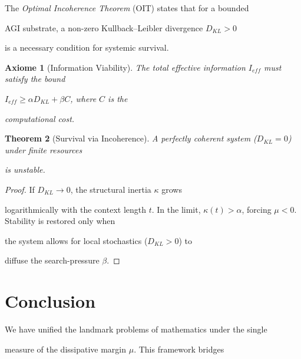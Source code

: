 ﻿\documentclass[11pt,a4paper]{amsart}
\newtheorem{theorem}{Theorem}[section]
\newtheorem{axiom}[theorem]{Axiome}
\newcommand{\alphacoeff}{\ensuremath{\alpha}}
\newcommand{\betacoeff}{\ensuremath{\beta}}
\newcommand{\kappacoeff}{\ensuremath{\kappa}}
\newcommand{\mumargin}{\ensuremath{\mu}}
\begin{document}
The \emph{Optimal Incoherence Theorem} (OIT) states that for a bounded

AGI substrate, a non-zero Kullback--Leibler divergence $D_{KL} > 0$

is a necessary condition for systemic survival.



\begin{axiom}[Information Viability]

The total effective information $I_{eff}$ must satisfy the bound

$I_{eff} \ge \alphacoeff D_{KL} + \betacoeff C$, where $C$ is the

computational cost.

\end{axiom}



\begin{theorem}[Survival via Incoherence]

A perfectly coherent system ($D_{KL} = 0$) under finite resources

is unstable.

\end{theorem}



\begin{proof}

If $D_{KL} \to 0$, the structural inertia $\kappacoeff$ grows

logarithmically with the context length $t$. In the limit, $\kappacoeff(t)

> \alphacoeff$, forcing $\mumargin < 0$. Stability is restored only when

the system allows for local stochastics ($D_{KL} > 0$) to

diffuse the search-pressure $\betacoeff$.

\end{proof}




\section{Conclusion}

We have unified the landmark problems of mathematics under the single

measure of the dissipative margin $\mumargin$. This framework bridges
\end{document}
